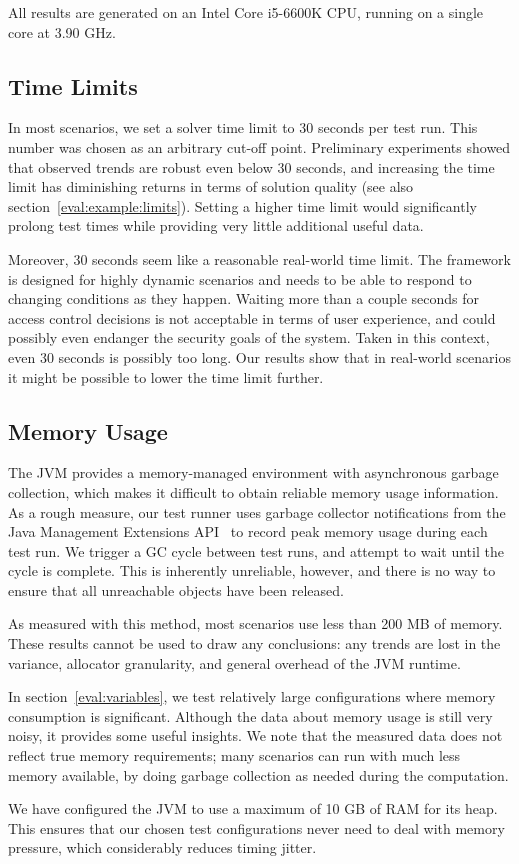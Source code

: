 All results are generated on an Intel\textregistered{} Core\texttrademark{} i5-6600K
CPU, running on a single core at 3.90 GHz.

\subsection{Time Limits}

In most scenarios, we set a solver time limit to 30 seconds per test run. This number
was chosen as an arbitrary cut-off point. Preliminary experiments showed that observed
trends are robust even below 30 seconds, and increasing the time limit has diminishing
returns in terms of solution quality (see also section~\ref{eval:example:limits}).
Setting a higher time limit would significantly prolong test times while providing very
little additional useful data.

Moreover, 30 seconds seem like a reasonable real-world time limit. The framework is
designed for highly dynamic scenarios and needs to be able to respond to changing
conditions as they happen. Waiting more than a couple seconds for access control
decisions is not acceptable in terms of user experience, and could possibly even
endanger the security goals of the system. Taken in this context, even 30 seconds is
possibly too long. Our results show that in real-world scenarios it might be possible to
lower the time limit further.

\subsection{Memory Usage}

The JVM provides a memory-managed environment with asynchronous garbage collection,
which makes it difficult to obtain reliable memory usage information. As a rough
measure, our test runner uses garbage collector notifications from the Java Management
Extensions API~\citep{jmx} to record peak memory usage during each test run. We trigger a
GC cycle between test runs, and attempt to wait until the cycle is complete. This is
inherently unreliable, however, and there is no way to ensure that all unreachable
objects have been released.

As measured with this method, most scenarios use less than 200 MB of memory. These
results cannot be used to draw any conclusions: any trends are lost in the variance,
allocator granularity, and general overhead of the JVM runtime.

In section~\ref{eval:variables}, we test relatively large configurations where memory
consumption is significant. Although the data about memory usage is still very noisy, it
provides some useful insights. We note that the measured data does not reflect true
memory requirements; many scenarios can run with much less memory available, by doing
garbage collection as needed during the computation.

We have configured the JVM to use a maximum of 10 GB of RAM for its heap. This ensures
that our chosen test configurations never need to deal with memory pressure, which
considerably reduces timing jitter.




